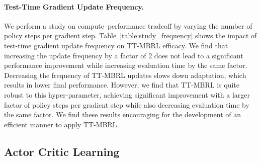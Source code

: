 

\paragraph{Test-Time Gradient Update Frequency.} We perform a study on compute–performance tradeoff by varying the number of policy steps per gradient step. Table~\ref{table:study_frequency} shows the impact of test-time gradient update frequency on TT-MBRL efficacy.  We find that increasing the update frequency by a factor of 2 does not lead to a significant performance improvement while increasing evaluation time by the same factor. Decreasing the frequency of TT-MBRL updates slows down adaptation, which results in lower final performance. However, we find that TT-MBRL is quite robust to this hyper-parameter, achieving significant improvement with a larger factor of policy steps per gradient step while also decreasing evaluation time by the same factor. We find these results encouraging for the development of an efficient manner to apply TT-MBRL.



\subsection{Actor Critic Learning}
\label{appendix:actor_critic}

